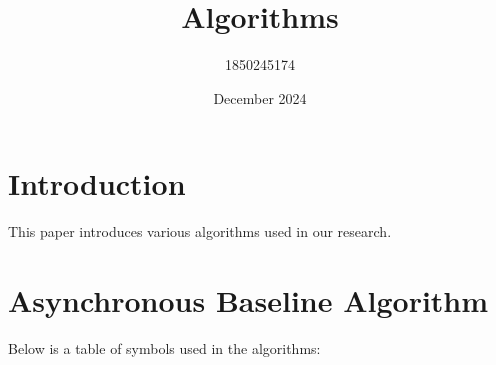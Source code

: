 \documentclass{article}
\title{Algorithms}
\author{1850245174 }
\date{December 2024}
\begin{document}
\maketitle

\section{Introduction}

This paper introduces various algorithms used in our research.

\section{Asynchronous Baseline Algorithm}

Below is a table of symbols used in the algorithms:
\end{document}
